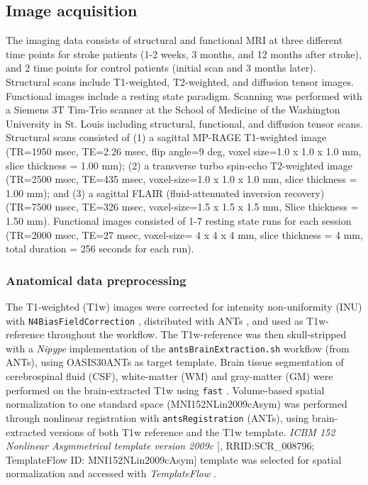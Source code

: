 \documentclass[fleqn,10pt]{wlscirep}
\begin{document}
\subsection*{Image acquisition}
The imaging data consists of structural and functional MRI at three different time points for stroke patients (1-2 weeks, 3 months, and 12 months after stroke), and 2 time points for control patients (initial scan and 3 months later). Structural scans include T1-weighted, T2-weighted, and diffusion tensor images. Functional images include a resting state paradigm. Scanning was performed with a Siemens 3T Tim-Trio scanner at the School of Medicine of the Washington University in St. Louis including structural, functional, and diffusion tensor scans. Structural scans consisted of (1) a sagittal MP-RAGE T1-weighted image (TR=1950 msec, TE=2.26 msec, flip angle=9 deg, voxel size=1.0 x 1.0 x 1.0 mm, slice thickness = 1.00 mm); (2) a transverse turbo spin-echo T2-weighted image (TR=2500 msec, TE=435 msec, voxel-size=1.0 x 1.0 x 1.0 mm, slice thickness = 1.00 mm); and (3) a sagittal FLAIR (fluid-attenuated inversion recovery) (TR=7500 msec, TE=326 msec, voxel-size=1.5 x 1.5 x 1.5 mm, Slice thickness = 1.50 mm). Functional images consisted of 1-7 resting state runs for each session (TR=2000 msec, TE=27 msec, voxel-size= 4 x 4 x 4 mm, slice thickness = 4 mm, total duration = 256 seconds for each run). 

\subsubsection*{Anatomical data preprocessing}
The T1-weighted (T1w) images were corrected for intensity non-uniformity (INU) with \texttt{N4BiasFieldCorrection} \citep{n4},
distributed with ANTs \citep[RRID:SCR\_004757]{ants},
and used as T1w-reference throughout the workflow. The T1w-reference was
then skull-stripped with a \emph{Nipype} implementation of the
\texttt{antsBrainExtraction.sh} workflow (from ANTs), using OASIS30ANTs
as target template. Brain tissue segmentation of cerebrospinal fluid
(CSF), white-matter (WM) and gray-matter (GM) were performed on the
brain-extracted T1w using \texttt{fast} \citep[FSL,
RRID:SCR\_002823,][]{fsl_fast}. Volume-based spatial normalization to
one standard space (MNI152NLin2009cAsym) was performed through nonlinear
registration with \texttt{antsRegistration} (ANTs),
using brain-extracted versions of both T1w reference and the T1w
template. \emph{ICBM 152 Nonlinear Asymmetrical
template version 2009c} {[}\citet{mni152nlin2009casym},
RRID:SCR\_008796; TemplateFlow ID: MNI152NLin2009cAsym{]} template was selected for spatial
normalization and accessed with \emph{TemplateFlow}
\citep[23.0.0,][]{ciric2022templateflow}.
\end{document}
